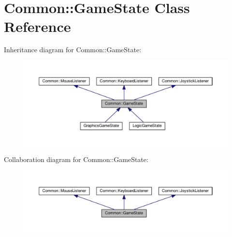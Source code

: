\hypertarget{class_common_1_1_game_state}{}\section{Common\+:\+:Game\+State Class Reference}
\label{class_common_1_1_game_state}


Inheritance diagram for Common\+:\+:Game\+State\+:\nopagebreak
\begin{figure}[H]
\begin{center}
\leavevmode
\includegraphics[width=350pt]{class_common_1_1_game_state__inherit__graph}
\end{center}
\end{figure}


Collaboration diagram for Common\+:\+:Game\+State\+:\nopagebreak
\begin{figure}[H]
\begin{center}
\leavevmode
\includegraphics[width=350pt]{class_common_1_1_game_state__coll__graph}
\end{center}
\end{figure}
